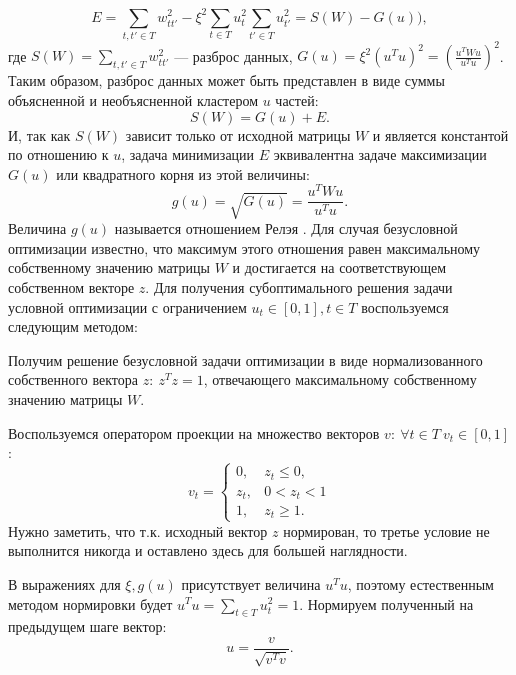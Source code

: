 \documentclass[12pt]{article}
\newenvironment{enumerate*}%
{\begin{enumerate}%
		\setlength{\itemsep}{0pt}%
		\setlength{\parskip}{0pt}}%
	{\end{enumerate}}
\begin{document}
\begin{equation}
	E = \sum_{t,t'\in T}w_{tt'}^2-\xi^2 \sum_{t\in T}u_t^2 \sum_{t'\in T}u_{t'}^2 = S(W) - G(u)),
\end{equation}
где $S(W)=\sum_{t,t'\in T}w_{tt'}^2$ --- разброс данных, $G(u) = \xi^2 (u^Tu)^2= \left(\frac{u^TWu}{u^Tu}\right)^2$. Таким образом, разброс данных может быть представлен в виде суммы объясненной и необъясненной кластером $u$ частей:
\begin{equation}
	S(W)=G(u)+E.
\end{equation}
И, так как $S(W)$ зависит только от исходной матрицы $W$ и является константой по отношению к $u$, задача минимизации $E$ эквивалентна задаче максимизации $G(u)$ или квадратного корня из этой величины:
\begin{equation}
	g(u)=\sqrt{G(u)} = \frac{u^TWu}{u^Tu}.
	\label{eq:rayleigh}
\end{equation}
Величина  $g(u)$ называется отношением Релэя \cite{parlett1998symmetric}. Для случая безусловной оптимизации известно, что максимум этого отношения равен максимальному собственному значению матрицы $W$ и достигается на соответствующем собственном векторе $z$. Для получения субоптимального решения задачи условной оптимизации с ограничением $u_t\in[0, 1], t\in T$ воспользуемся следующим методом:
\begin{enumerate*}
	\item Получим решение безусловной задачи оптимизации в виде нормализованного собственного вектора $z:\ z^Tz=1$, отвечающего максимальному собственному значению матрицы $W$.
	\item Воспользуемся оператором проекции на множество векторов ${v:\ \forall t\in T\ v_t\in[0, 1]}$:
	\begin{equation}
		v_t =\begin{cases}
		0, & z_t \leq 0,\\
		z_t, & 0<z_t<1\\
		1, & z_t\geq 1.
		\end{cases}
	\end{equation}
	Нужно заметить, что т.к. исходный вектор $z$ нормирован, то третье условие не выполнится никогда и оставлено здесь для большей наглядности.
	\item В выражениях для $\xi, g(u)$ присутствует величина $u^Tu$, поэтому естественным методом нормировки будет $u^Tu=\sum_{t\in T} u_t^2=1$. Нормируем полученный на предыдущем шаге вектор:
	\begin{equation}
		u = \frac{v}{\sqrt{v^Tv}}.
	\end{equation}
\end{enumerate*}
\end{document}
